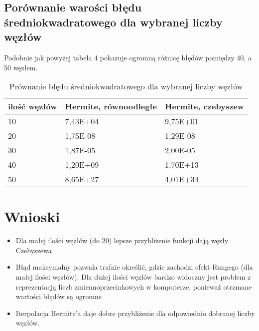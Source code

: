 \documentclass{article}
\begin{document}
\subsection{Porównanie warości błędu średniokwadratowego dla wybranej liczby węzłów}

Podobnie jak powyżej tabela 4 pokazuje ogromną różnicę błędów pomiędzy 40, a 50 węzłem.

\begin{table}[!ht]
    \centering
    \begin{tabular}{|l|l|l|}
    \hline
        ilość węzłów & Hermite, równoodległe & Hermite, czebyszew  \\ \hline
        10 & 7,43E+04 & 9,75E+01  \\ \hline
        20 & 1,75E-08 & 1,29E-08  \\ \hline
        30 & 1,87E-05 & 2,00E-05  \\ \hline
        40 & 1,20E+09 & 1,70E+13  \\ \hline
        50 & 8,65E+27 & 4,01E+34 \\ \hline
    \end{tabular}
    \caption{Prównanie błędu średniokwadratowego dla wybranej liczby węzłów}
\end{table}

\section{Wnioski}

\begin{itemize}
\item Dla małej ilości węzłów (do 20) lepsze przybliżenie funkcji dają węzły Czebyszewa
\item Błąd maksymalny pozwala trafnie określić, gdzie zachodzi efekt Rungego (dla małej ilości węzłów). Dla dużej ilości węzłów bardzo widoczny jest problem z reprezentacją liczb zmiennoprzecinkowych w komputerze, ponieważ otrzmane wartości błędów są ogromne
\item Iterpolacja Hermite'a daje dobre przybliżenie dla odpowiednio dobranej liczby węzłów.
\end{itemize}
\end{document}
